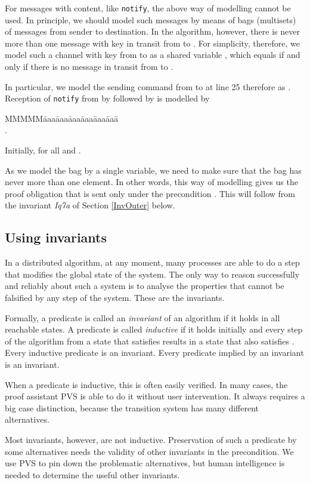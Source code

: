 \documentclass[10pt]{article} \usepackage[english]{babel}
\newenvironment{tab}{\begin{tabbing}
MMMMM\=aaa\=aaa\=aaa\=aaa\=aaa\=aaa\= \kill}{\end{tabbing}}
\def\S #1/{\mbox {\textsl{#1}}}
\def\T #1/{\mbox {\texttt{#1}}}
\begin{document}
For messages with content, like \T notify/, the above way of modelling
cannot be used.  In principle, we should model such messages by means
of bags (multisets) of messages from sender to destination. In the
algorithm, however, there is never more than one message with key 
in transit from  to . For simplicity, therefore, we model such a
channel with key  from  to  as a shared variable ,
which equals  if and only if there is no message  in transit
from  to .

In particular, we model the sending command  from  to  at line 25 therefore as .  Reception of \T notify/ from  by  followed by  is
modelled by
\begin{tab}
\> \+\+ \\
 .
\end{tab}
Initially,  for all  and . 

As we model the bag by a single variable, we need to make sure that
the bag has never more than one element.  In other words, this way of
modelling gives us the proof obligation that  is sent
only under the precondition .  This will
follow from the invariant \S Iq7a/ of Section \ref {InvOuter} below.

\subsection{Using invariants} \label{safety}

In a distributed algorithm, at any moment, many processes are able to
do a step that modifies the global state of the system. The only way
to reason successfully and reliably about such a system is to analyse
the properties that cannot be falsified by any step of the
system. These are the invariants.

Formally, a predicate is called an \emph{invariant} of an algorithm if
it holds in all reachable states.  A predicate  is called
\emph{inductive} if it holds initially and every step of the algorithm
from a state that satisfies  results in a state that also satisfies
.  Every inductive predicate is an invariant. Every predicate
implied by an invariant is an invariant.

When a predicate is inductive, this is often easily verified. In many
cases, the proof assistant PVS is able to do it without user
intervention. It always requires a big case distinction, because the
transition system has many different alternatives.

Most invariants, however, are not inductive.  Preservation of such a
predicate by some alternatives needs the validity of other invariants
in the precondition. We use PVS to pin down the problematic
alternatives, but human intelligence is needed to determine the useful
other invariants.
\end{document}
